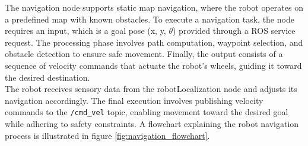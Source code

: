 \documentclass{CSSRforAfrica}
\begin{document}
\noindent The navigation node supports static map navigation, where the robot operates on a predefined map with known obstacles. To execute a navigation task, the node requires an input, which is a goal pose (x, y, $\theta$) provided through a ROS service request. The processing phase involves path computation, waypoint selection, and obstacle detection to ensure safe movement. Finally, the output consists of a sequence of velocity commands that actuate the robot’s wheels, guiding it toward the desired destination.\\

\noindent The robot receives sensory data from the robotLocalization node and adjusts its navigation accordingly. The final execution involves publishing velocity commands to the \texttt{/cmd\_vel} topic, enabling movement toward the desired goal while adhering to safety constraints. A flowchart explaining the robot navigation process is illustrated in figure \ref{fig:navigation_flowchart}.
\end{document}
